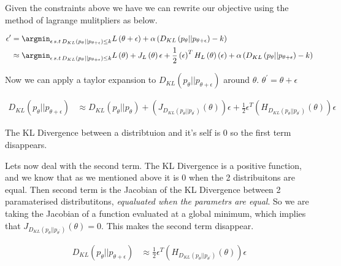 \documentclass[12pt, a4paper]{report}
\theoremstyle{definition}
\begin{document}
Given the constraints above we have we can rewrite our objective using the method of lagrange mulitpliers as below.

\begin{align}
    \epsilon^\prime &= \argmin_{\epsilon \, s.t \, D_{KL} \left(p_\theta || p_{\theta + \epsilon} \right) \leq k} L \left( \theta + \epsilon \right) + \alpha \left( D_{KL} \left(p_\theta || p_{\theta + \epsilon} \right) - k\right) \\
    &\approx \argmin_{\epsilon \, s.t \, D_{KL} \left(p_\theta || p_{\theta + \epsilon} \right) \leq k}  L\left( \theta \right) +  J_L \left( \theta\right) \epsilon  + \frac{1}{2} \left(\epsilon \right)^T H_L \left(\theta \right) \left( \epsilon\right) + \alpha \left( D_{KL} \left(p_\theta || p_{\theta + \epsilon} \right) - k\right) \\
\end{align}

Now we can apply a taylor expansion to $D_{KL} \left(p_\theta || p_{\theta + \epsilon} \right)$ around $\theta$. $\theta^\prime = \theta + \epsilon$


\begin{align}
    D_{KL} \left(p_\theta || p_{\theta + \epsilon} \right) &\approx  D_{KL} \left(p_\theta || p_{\theta} \right) + \left(J_{D_{KL} \left(p_\theta || p_{\theta^\prime} \right)}\left( \theta \right) \right) \epsilon + \frac{1}{2} \epsilon^T \left( H_{D_{KL} \left(p_\theta || p_{\theta^\prime} \right)}\left( \theta \right) \right) \epsilon
\end{align}

The KL Divergence between a distribtuion and it's self is $0$ so the first term disappears.


Lets now deal with the second term. The KL Divergence is a positive function, and we know that as we mentioned above it is $0$ when the 2 distribuitons are equal. Then second term is the Jacobian of the KL Divergence between 2 paramaterised distributitons, \textit{equaluated when the parametrs are equal}. So we are taking the Jacobian of a function evaluated at a global minimum, which implies that $J_{D_{KL} \left(p_\theta || p_{\theta^\prime} \right)}\left( \theta \right)  = 0$. This makes the second term disappear.


\begin{align}
    D_{KL} \left(p_\theta || p_{\theta + \epsilon} \right) &\approx  \frac{1}{2} \epsilon^T \left( H_{D_{KL} \left(p_\theta || p_{\theta^\prime} \right)}\left( \theta \right) \right) \epsilon
\end{align}
\end{document}
